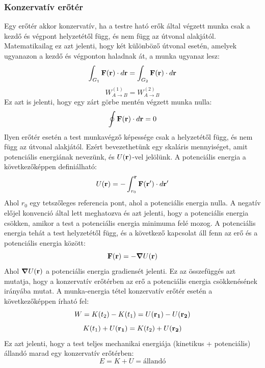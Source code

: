 \documentclass[../main.tex]{subfiles}
\begin{document}
\subsubsection{Konzervatív erőtér}
Egy erőtér akkor konzervatív, ha a testre ható erők által végzett munka csak a kezdő és végpont helyzetétől függ, és nem függ az útvonal alakjától. Matematikailag ez azt jelenti, 
hogy két különböző útvonal esetén, amelyek ugyanazon a kezdő és végponton haladnak át, a munka ugyanaz lesz:
\begin{equation}
    \int_{G_1}^{} \bold{F}(\bold{r}) \cdot d\bold{r} = \int_{G_2}^{} \bold{F}(\bold{r}) \cdot d\bold{r}
\end{equation}
\begin{equation}
    W_{A \to B}^{(1)} = W_{A \to B}^{(2)}
\end{equation}
Ez azt is jelenti, hogy egy zárt görbe mentén végzett munka nulla:
\begin{equation}
    \oint \bold{F}(\bold{r}) \cdot d\bold{r} = 0
\end{equation}
Ilyen erőtér esetén a test munkavégző képessége csak a helyzetétől függ, és nem függ az útvonal alakjától. Ezért bevezethetünk egy skaláris mennyiséget, amit potenciális energiának nevezünk, és $U(\bold{r})$-vel jelölünk. A potenciális energia a következőképpen definiálható:
\begin{equation}
    U(\bold{r}) = - \int_{r_0}^{\bold{r}} \bold{F}(\bold{r'}) \cdot d\bold{r'}
\end{equation}
Ahol $r_0$ egy tetszőleges referencia pont, ahol a potenciális energia nulla. A negatív előjel konvenció által lett meghatozva és azt jelenti, hogy a potenciális energia csökken, amikor a test a potenciális energia minimuma felé mozog.
A potenciális energia tehát a test helyzetétől függ, és a következő kapcsolat áll fenn az erő és a potenciális energia között:
\begin{equation}
    \bold{F}(\bold{r}) = - \boldsymbol{\nabla} U(\bold{r})
\end{equation}
Ahol $\boldsymbol{\nabla} U(\bold{r})$ a potenciális energia gradiensét jelenti. Ez az összefüggés azt mutatja, hogy a konzervatív erőtérben az erő a potenciális energia csökkenésének irányába mutat. A munka-energia tétel konzervatív erőtér esetén a következőképpen írható fel:
\begin{equation}
    W = K(t_2) - K(t_1) = U(\bold{r_1}) - U(\bold{r_2})
\end{equation}
\begin{equation}
    K(t_1) + U(\bold{r_1}) = K(t_2) + U(\bold{r_2})
\end{equation}
Ez azt jelenti, hogy a test teljes mechanikai energiája (kinetikus + potenciális) állandó marad egy konzervatív erőtérben:
\begin{equation}
    E = K + U = \text{állandó}
\end{equation}
\end{document}
